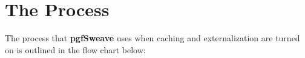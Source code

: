 \documentclass{article}
\newcommand{\pkg}{\textbf}
\begin{document}
\begin{figure}[!hp]
\end{figure}

\clearpage

\section{The Process}
The process that \pkg{pgfSweave} uses when caching and externalization are turned on is outlined in the flow chart below:
\end{document}
